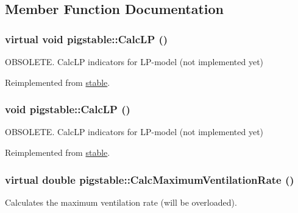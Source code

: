 \subsection{Member Function Documentation}
\hypertarget{classpigstable_aff8c1aa84a8727d9a5c6d060bf6fe323}{
\subsubsection[{CalcLP}]{\setlength{\rightskip}{0pt plus 5cm}virtual void pigstable::CalcLP ()}}
\label{classpigstable_aff8c1aa84a8727d9a5c6d060bf6fe323}


OBSOLETE. CalcLP indicators for LP-\/model (not implemented yet) 

Reimplemented from \hyperlink{classstable_acaf566bef659f0a671e27afa6244df4b}{stable}.\hypertarget{classpigstable_a9e56606838c623a05cb2f6e0b721cc47}{
\subsubsection[{CalcLP}]{\setlength{\rightskip}{0pt plus 5cm}void pigstable::CalcLP ()}}
\label{classpigstable_a9e56606838c623a05cb2f6e0b721cc47}


OBSOLETE. CalcLP indicators for LP-\/model (not implemented yet) 

Reimplemented from \hyperlink{classstable_acaf566bef659f0a671e27afa6244df4b}{stable}.\hypertarget{classpigstable_a1695437806e4b3d9a68c0ec872a4f846}{
\subsubsection[{CalcMaximumVentilationRate}]{\setlength{\rightskip}{0pt plus 5cm}virtual double pigstable::CalcMaximumVentilationRate ()}}
\label{classpigstable_a1695437806e4b3d9a68c0ec872a4f846}


Calculates the maximum ventilation rate (will be overloaded). 

